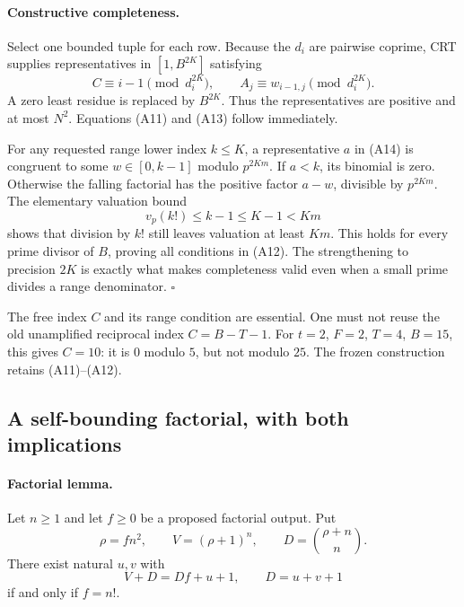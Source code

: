 \paragraph{Constructive completeness.}
Select one bounded tuple for each row.  Because the \(d_i\) are pairwise
coprime, CRT supplies representatives in \([1,B^{2K}]\) satisfying
\[
 C\equiv i-1\pmod{d_i^{2K}},\qquad
 A_j\equiv w_{i-1,j}\pmod{d_i^{2K}}.                    \tag{A14}
\]
A zero least residue is replaced by \(B^{2K}\).
Thus the representatives are positive and at most \(N^2\).
Equations (A11) and (A13) follow immediately.

For any requested range lower index \(k\le K\), a representative \(a\)
in (A14) is congruent to some \(w\in[0,k-1]\) modulo \(p^{2Km}\).
If \(a<k\), its binomial is zero.  Otherwise the falling factorial has
the positive factor \(a-w\), divisible by \(p^{2Km}\).
The elementary valuation bound
\[
 v_p(k!)\le k-1\le K-1<Km
\]
shows that division by \(k!\) still leaves valuation at least \(Km\).
This holds for every prime divisor of \(B\), proving all conditions
in (A12).  The strengthening to precision \(2K\) is exactly what
makes completeness valid even when a small prime divides a range
denominator.
\hfill\(\square\)

The free index \(C\) and its range condition are essential.
One must not reuse the old unamplified reciprocal index \(C=B-T-1\).
For \(t=2\), \(F=2\), \(T=4\), \(B=15\), this gives \(C=10\):
it is \(0\) modulo \(5\), but not modulo \(25\).
The frozen construction retains (A11)--(A12).

\subsection{A self-bounding factorial, with both implications}

\paragraph{Factorial lemma.}
Let \(n\ge1\) and let \(f\ge0\) be a proposed factorial output.  Put
\[
 \rho=fn^2,\qquad V=(\rho+1)^n,\qquad D=\binom{\rho+n}{n}.
\]
There exist natural \(u,v\) with
\[
 V+D=Df+u+1,\qquad D=u+v+1                              \tag{A15}
\]
if and only if \(f=n!\).

